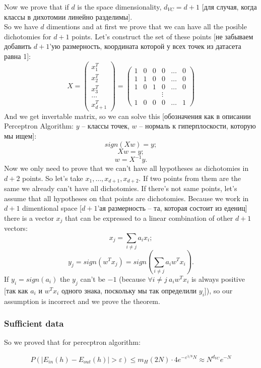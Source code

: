 Now we prove that if $d$ is the space dimensionality, $d_{VC}=d+1$ [для случая, когда классы в дихотомии линейно разделимы].\\
So we have $d$ dimentions and at first we prove that we can have all the posible dichotomies for $d+1$ points. Let's construct the set of these points [не забываем добавить $d+1$'ую размерность, координата которой у всех точек из датасета равна 1]:
$$X=
\begin{pmatrix}
  x_1^T \\
  x_2^T \\
  x_3^T \\
  \ldots \\
  x_{d+1}^T
\end{pmatrix}
=
\begin{pmatrix}
  1 & 0 & 0 & 0 & \ldots & 0 \\
  1 & 1 & 0 & 0 & \ldots & 0 \\
  1 & 0 & 1 & 0 & \ldots & 0 \\
    &   &   & \vdots \\
  1 & 0 & 0 & 0 & \ldots & 1
\end{pmatrix}
$$
And we get invertable matrix, so we can solve this [обозначения как в описании Perceptron Algorithm: $y$ -- классы точек, $w$ -- нормаль к гиперплоскости, которую мы ищем]:
$$sign(Xw)=y;$$
$$Xw=y;$$
$$w=X^{-1}y.$$
Now we only need to prove that we can't have all hypotheses as dichotomies in $d+2$ points. So let's take $x_1,\ldots,x_{d+1},x_{d+2}$.  If two points from them are the same we already can't have all dichotomies. If there's not same points, let's assume that all hypotheses on that points are dichotomies. Because we work in $d+1$ dimentional space [$d+1$'ая размерность -- та, которая состоит из едениц] there is a vector $x_j$ that can be expressed to a linear combination of other $d+1$ vectors:
$$x_j=\sum\limits_{i\ne j}a_ix_i;$$
$$y_j=sign(w^Tx_j)=sign\left(\sum\limits_{i\ne j}a_iw^Tx_i\right).$$
If $y_i=sign(a_i)$ the $y_j$ can't be $-1$ (because $\forall i\ne j\ a_iw^Tx_i$ is always positive [так как $a_i$ и $w^Tx_i$ одного знака, поскольку мы так определили $y_i$]), so our assumption is incorrect and we prove the theorem.

\subsubsection*{Sufficient data}

So we proved that for perecptron algorithm:

$$P(|E_{in}(h)-E_{out}(h)|>\varepsilon)\le m_H(2N)\cdot4e^{-\varepsilon^{1/8}N}\approx N^{d_{VC}}e^{-N}$$

